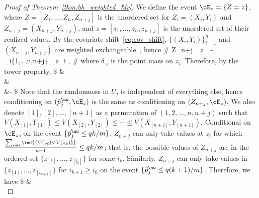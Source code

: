 \begin{proof}[Proof of Theorem~\ref{thm:bh_weighted_fdr}]
We define the event $\cE_z = \{Z=z\}$,
where $Z=[Z_1,\dots,Z_n, Z_{n+j}]$ is the unordered set
for $Z_i = (X_i,Y_i)$ and $Z_{n+j}=(X_{n+j},Y_{n+j})$,
and $z=[z_1,\dots,z_n,z_{n+j}]$ is the unordered set of
their realized values. By the covariate shift~\eqref{eq:cov_shift},
$\{(X_{i},Y_i)\}_{i=1}^n$ and $(X_{n+j},Y_{n+j})$ are
weighted exchangeable~\cite{tibshirani2019conformal}, hence
\#\label{eq:weighted_exch}
Z_{n+j} \given \cE_z ~\sim ~ \sum_{i\in \{1,\dots,n,n+j\}} \delta_{z_i} \cdot {},
\#
where $\delta_{z_i}$ is the point mass on $z_i$.
Therefore,
by the tower property,
\$
&\EE{} \\
&\leq \EE{}  \\
&\quad - \EE{}%
\$
Note that the randomness in $U_j$ is independent of everything else, hence
conditioning on $(\bar{p}_j^\nw,\cE_z)$ is the same as conditioning on $(Z_{n+j},\cE_z)$.
We also denote $[1],[2],\dots,[n+1]$ as a permutation of
$(1,2,\dots,n,n+j)$ such that $V(X_{[1]},Y_{[1]}) \leq V(X_{[2]},Y_{[2]}) \leq \cdots \leq V(X_{[n+1]},Y_{[n+1]})$.
Conditional on $\cE_z$,
on the event $\{\bar{p}_j^\nw\leq q k/m\}$,
$Z_{n+j}$ can only take values at $z_i$ for which
$\frac{\sum_{\ell\neq i} \ind {\{V(z_\ell)<V(z_k)\}} }{n+1} \leq q k/m$;
that is, the possible values of $Z_{n+j}$
are in  the ordered set $\{z_{[1]},\dots,z_{[i_k]}\}$ for some $i_k$.
Similarly, $Z_{n+j}$ can only take values in
$\{z_{[1]},\dots,z_{[i_{k+1}]}\}$ for $i_{k+1}\geq i_k$ on
the event $\{\bar{p}_j^\nw\leq q (k+1)/m\}$.
Therefore, we have
\$
&\EE{} \\

\end{proof}
